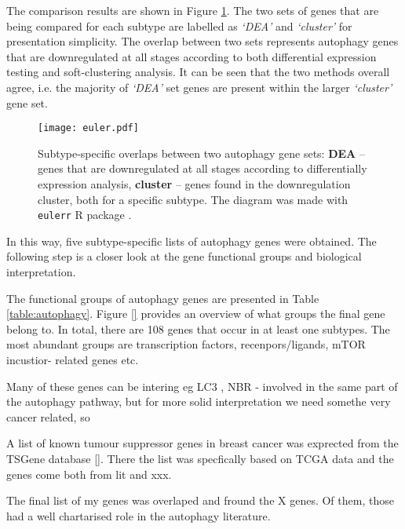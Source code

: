 The comparison results are shown in Figure \ref{fig:overlapdown}. The two sets of genes that are being compared for each subtype are labelled as \textit{‘DEA’} and \textit{‘cluster’ }for presentation simplicity. The overlap between two sets represents autophagy genes that are downregulated at all stages according to both differential expression testing and soft-clustering analysis. It can be seen that the two methods overall agree, i.e. the majority of \textit{‘DEA’} set genes are present within the larger \textit{‘cluster’ }gene set. 

            \begin{figure}[!h]
            \centering
            \texttt{[image: euler.pdf]} 
            \caption[Subtype-specific overlaps between downregulated autophagy genes identified by two methods]{Subtype-specific overlaps between two autophagy gene sets: \textbf{DEA} -- genes that are downregulated at all stages according to differentially expression analysis, \textbf{cluster} -- genes found in the downregulation cluster, both for a specific subtype. The diagram was made with \texttt{eulerr} R package \cite{euler}. }
            \label{fig:overlapdown}
            \end{figure}
            
In this way, five subtype-specific lists of autophagy genes were obtained. The following step is a closer look at the gene functional groups and biological interpretation. 

The functional groups of autophagy genes are presented in Table \ref{table:autophagy}. Figure \ref{} provides an overview of what groups the final gene belong to. In total, there are 108 genes that occur in at least one subtypes. The most abundant groups are transcription factors, recenpors/ligands, mTOR incustior- related genes etc.





Many of these genes can be intering eg LC3 , NBR - involved in the same part of the autophagy pathway, but for more solid interpretation we need somethe very cancer related, so

A list of known tumour suppressor genes in breast cancer was exprected from the TSGene database \ref{}. There the list was specfically based on TCGA data and the genes come both from lit and xxx.



The final list of my genes was overlaped and fround the X genes. Of them, those had a well chartarised role in the autophagy literature. 